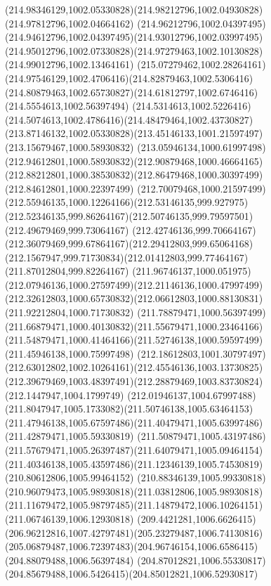 {{		\curveto(214.98346129,1002.05330828)(214.98212796,1002.04930828)(214.97812796,1002.04664162)
		\curveto(214.96212796,1002.04397495)(214.94612796,1002.04397495)(214.93012796,1002.03997495)
		\curveto(214.95012796,1002.07330828)(214.97279463,1002.10130828)(214.99012796,1002.13464161)
		\curveto(215.07279462,1002.28264161)(214.97546129,1002.4706416)(214.82879463,1002.5306416)
		\curveto(214.80879463,1002.65730827)(214.61812797,1002.6746416)(214.5554613,1002.56397494)
		\curveto(214.5314613,1002.5226416)(214.5074613,1002.4786416)(214.48479464,1002.43730827)
		\curveto(213.87146132,1002.05330828)(213.45146133,1001.21597497)(213.15679467,1000.58930832)
		\curveto(213.05946134,1000.61997498)(212.94612801,1000.58930832)(212.90879468,1000.46664165)
		\curveto(212.88212801,1000.38530832)(212.86479468,1000.30397499)(212.84612801,1000.22397499)
		\curveto(212.70079468,1000.21597499)(212.55946135,1000.12264166)(212.53146135,999.927975)
		\curveto(212.52346135,999.86264167)(212.50746135,999.79597501)(212.49679469,999.73064167)
		\curveto(212.42746136,999.70664167)(212.36079469,999.67864167)(212.29412803,999.65064168)
		\curveto(212.1567947,999.71730834)(212.01412803,999.77464167)(211.87012804,999.82264167)
		\curveto(211.96746137,1000.051975)(212.07946136,1000.27597499)(212.21146136,1000.47997499)
		\curveto(212.32612803,1000.65730832)(212.06612803,1000.88130831)(211.92212804,1000.71730832)
		\curveto(211.78879471,1000.56397499)(211.66879471,1000.40130832)(211.55679471,1000.23464166)
		\curveto(211.54879471,1000.41464166)(211.52746138,1000.59597499)(211.45946138,1000.75997498)
		\curveto(212.18612803,1001.30797497)(212.63012802,1002.10264161)(212.45546136,1003.13730825)
		\curveto(212.39679469,1003.48397491)(212.28879469,1003.83730824)(212.1447947,1004.1799749)
		\curveto(212.01946137,1004.67997488)(211.8047947,1005.1733082)(211.50746138,1005.63464153)
		\curveto(211.47946138,1005.67597486)(211.40479471,1005.63997486)(211.42879471,1005.59330819)
		\curveto(211.50879471,1005.43197486)(211.57679471,1005.26397487)(211.64079471,1005.09464154)
		\curveto(211.40346138,1005.43597486)(211.12346139,1005.74530819)(210.80612806,1005.99464152)
		\curveto(210.88346139,1005.99330818)(210.96079473,1005.98930818)(211.03812806,1005.98930818)
		\curveto(211.11679472,1005.98797485)(211.14879472,1006.10264151)(211.06746139,1006.12930818)
		\curveto(209.4421281,1006.6626415)(206.96212816,1007.42797481)(205.23279487,1006.74130816)
		\curveto(205.06879487,1006.72397483)(204.96746154,1006.6586415)(204.88079488,1006.56397484)
		\curveto(204.87012821,1006.55330817)(204.85679488,1006.5426415)(204.85012821,1006.52930817)
}}
